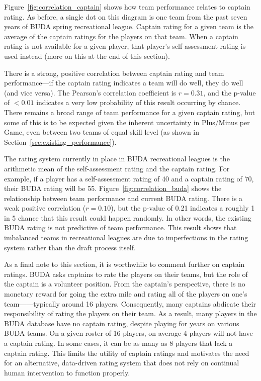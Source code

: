 Figure~\ref{fig:correlation_captain} shows how team performance relates to captain rating.  As before, a single dot on this diagram is one team from the past seven years of BUDA spring recreational league.  Captain rating for a given team is the average of the captain ratings for the players on that team. When a captain rating is not available for a given player, that player's self-assessment rating is used instead (more on this at the end of this section).

There is a strong, positive correlation between captain rating and team performance---if the captain rating indicates a team will do well, they do well (and vice versa). The Pearson's correlation coefficient is $r = 0.31$, and the p-value of $<0.01$ indicates a very low probability of this result occurring by chance. There remains a broad range of team performance for a given captain rating, but some of this is to be expected given the inherent uncertainty in Plus/Minus per Game, even between two teams of equal skill level (as shown in Section~\ref{sec:existing_performance}).

The rating system currently in place in BUDA recreational leagues is the arithmetic mean of the self-assessment rating and the captain rating.  For example, if a player has a self-assessment rating of 40 and a captain rating of 70, their BUDA rating will be 55. Figure~\ref{fig:correlation_buda} shows the relationship between team performance and current BUDA rating. There is a weak positive correlation ($r = 0.10$), but the p-value of 0.21 indicates a roughly 1 in 5 chance that this result could happen randomly.  In other words, the existing BUDA rating is not predictive of team performance. This result shows that imbalanced teams in recreational leagues are due to imperfections in the rating system rather than the draft process itself.

As a final note to this section, it is worthwhile to comment further on captain ratings. BUDA asks captains to rate the players on their teams, but the role of the captain is a volunteer position. From the captain's perspective, there is no monetary reward for going the extra mile and rating all of the players on one's team——typically around 16 players. Consequently, many captains abdicate their responsibility of rating the players on their team. As a result, many players in the BUDA database have no captain rating, despite playing for years on various BUDA teams. On a given roster of 16 players, on average 4 players will not have a captain rating. In some cases, it can be as many as 8 players that lack a captain rating. This limits the utility of captain ratings and motivates the need for an alternative, data-driven rating system that does not rely on continual human intervention to function properly.
